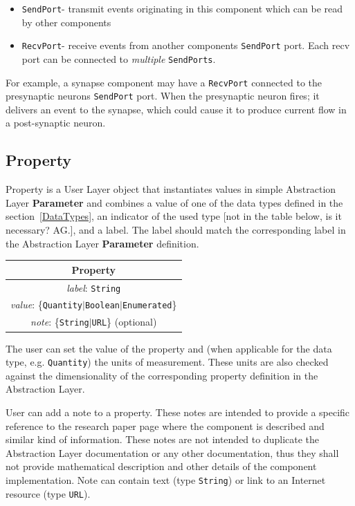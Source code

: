 \documentclass{article}
\newcommand{\Parameter}{{\bf{Parameter}}\xspace}
\newcommand{\SendPort}{{\tt{SendPort}}\xspace}
\newcommand{\RecvPort}{{\tt{RecvPort}}\xspace}
\newcommand{\SendPorts}{{\tt{SendPorts}}\xspace}
\begin{document}
\begin{itemize}
\item \SendPort - transmit events originating in this component which can be read by
other components
\item \RecvPort - receive events from another components \SendPort port.
Each recv port can be connected to \emph{multiple} \SendPorts.
\end{itemize}

For example, a synapse component may have a \RecvPort connected to the
presynaptic neurons \SendPort port. When the presynaptic neuron fires;
it delivers an event to the synapse, which could cause it to produce current
flow in a post-synaptic neuron.

\subsection{Property}

Property is a User Layer object that instantiates values in simple
Abstraction Layer \Parameter and combines a value of one of the data
types defined in the section~\ref{DataTypes}, an indicator of the used type
[not in the table below, is it necessary? AG.],
and a label. The label should match the corresponding label in the
Abstraction Layer \Parameter definition.

\begin{table}[htb]
\center
\begin{tabular}{|c|}
\hline
\hline
Property \\
\hline
\hline
{\em label}: {\tt String} \\
\hline
{\em value}: \{{\tt Quantity}$|${\tt Boolean}$|${\tt Enumerated}\} \\
\hline
{\em note}: \{{\tt String}$|${\tt URL}\} (optional)\\
\hline
\end{tabular}
\end{table}

The user can set the value of the property and (when applicable for the data
type, e.g. {\tt Quantity}) the units of measurement. These units are also
checked against the dimensionality of the corresponding property definition
in the Abstraction Layer.

User can add a note to a property. These notes are
intended to provide a specific reference to the research paper page
where the component is described and similar kind of information. These
notes are not intended to duplicate the Abstraction Layer documentation
or any other documentation, thus they shall not provide mathematical
description and other details of the component implementation. Note can
contain text (type {\tt String}) or link to an Internet resource (type
{\tt URL}).
\end{document}
